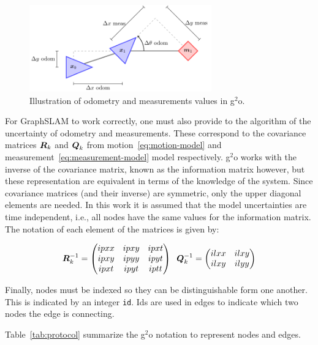 \begin{figure}[htbp!]
    \centering
    \includegraphics[width=0.7\textwidth]{tikz/protocol.pdf}
    \caption{Illustration of odometry and measurements values in g$^2$o.}
    \label{fig:protocol}
\end{figure}

For GraphSLAM to work correctly, one must also provide to the algorithm of the uncertainty of odometry and measurements. These correspond to the covariance matrices $\boldsymbol{R}_k$ and $\boldsymbol{Q}_k$ from motion~\eqref{eq:motion-model} and measurement~\eqref{eq:measurement-model} model respectively. g$^2$o works with the inverse of the covariance matrix, known as the information matrix however, but these representation are equivalent in terms of the knowledge of the system. Since covariance matrices (and their inverse) are symmetric, only the upper diagonal elements are needed. In this work it is assumed that the model uncertainties are time independent, i.e., all nodes have the same values for the information matrix. The notation of each element of the matrices is given by:

\begin{equation}
    \boldsymbol{R}^{-1}_k = \begin{pmatrix}
    ipxx & ipxy & ipxt\\
    ipxy & ipyy & ipyt\\
    ipxt & ipyt & iptt
    \end{pmatrix} \;\;
    \boldsymbol{Q}^{-1}_k = \begin{pmatrix}
    ilxx & ilxy\\
    ilxy & ilyy
    \end{pmatrix} 
    \label{eq:info-matrices}
\end{equation}

Finally, nodes must be indexed so they can be distinguishable form one another. This is indicated by an integer \texttt{id}. Ids are used in edges to indicate which two nodes the edge is connecting.

Table~\ref{tab:protocol} summarize the g$^2$o notation to represent nodes and edges.

